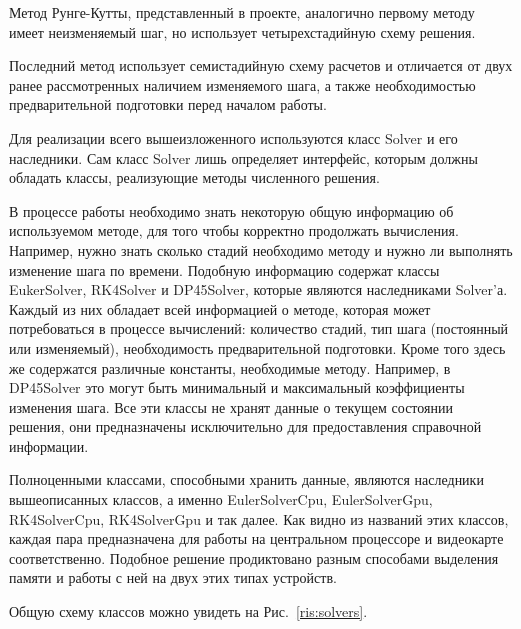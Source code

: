 \documentclass[a4paper, 14pt]{extarticle}
\theoremstyle{definition}
\begin{document}
\par Метод Рунге-Кутты, представленный в проекте, аналогично первому методу имеет неизменяемый шаг, но использует четырехстадийную схему решения.

\par Последний метод использует семистадийную схему расчетов и отличается от двух ранее рассмотренных наличием изменяемого шага, а также необходимостью предварительной подготовки перед началом работы.

\par Для реализации всего вышеизложенного используются класс Solver и его наследники. Сам класс Solver лишь определяет интерфейс, которым должны обладать классы, реализующие методы численного решения.

\par В процессе работы необходимо знать некоторую общую информацию об используемом методе, для того чтобы корректно продолжать вычисления. Например, нужно знать сколько стадий необходимо методу и нужно ли выполнять изменение шага по времени. Подобную информацию содержат классы EukerSolver, RK4Solver и DP45Solver, которые являются наследниками Solver'а. Каждый из них обладает всей информацией о методе, которая может потребоваться в процессе вычислений: количество стадий, тип шага (постоянный или изменяемый), необходимость предварительной подготовки. Кроме того здесь же содержатся различные константы, необходимые методу. Например, в DP45Solver это могут быть минимальный и максимальный коэффициенты изменения шага. Все эти классы не хранят данные о текущем состоянии решения, они предназначены исключительно для предоставления справочной информации.

\par Полноценными классами, способными хранить данные, являются наследники вышеописанных классов, а именно EulerSolverCpu, EulerSolverGpu, RK4SolverCpu, RK4SolverGpu и так далее. Как видно из названий этих классов, каждая пара предназначена для работы на центральном процессоре и видеокарте соответственно. Подобное решение продиктовано разным способами выделения памяти и работы с ней на двух этих типах устройств.

\par Общую схему классов можно увидеть на Рис.~\ref{ris:solvers}.

\end{document}
